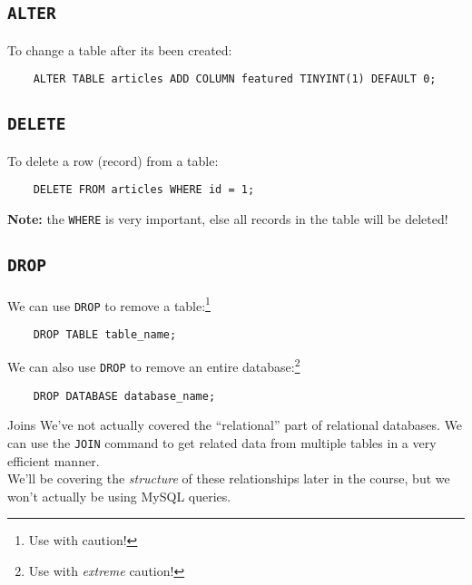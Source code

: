 \subsection{\texttt{ALTER}}

To change a table after its been created:

\begin{verbatim}
    ALTER TABLE articles ADD COLUMN featured TINYINT(1) DEFAULT 0;
\end{verbatim}

\subsection{\texttt{DELETE}}

To delete a row (record) from a table:

\begin{verbatim}
    DELETE FROM articles WHERE id = 1;
\end{verbatim}

\textbf{Note:} the \texttt{WHERE} is very important, else all records in the table will be deleted!

\subsection{\texttt{DROP}}

We can use \texttt{DROP} to remove a table:\footnote{Use with caution!}

\begin{verbatim}
    DROP TABLE table_name;
\end{verbatim}

We can also use \texttt{DROP} to remove an entire database:\footnote{Use with \textit{extreme} caution!}

\begin{verbatim}
    DROP DATABASE database_name;
\end{verbatim}

\begin{infobox}{Joins}
    We've not actually covered the ``relational'' part of relational databases. We can use the \texttt{JOIN} command to get related data from multiple tables in a very efficient manner.
    \\

    We'll be covering the \textit{structure} of these relationships later in the course, but we won't actually be using MySQL queries.
\end{infobox}


